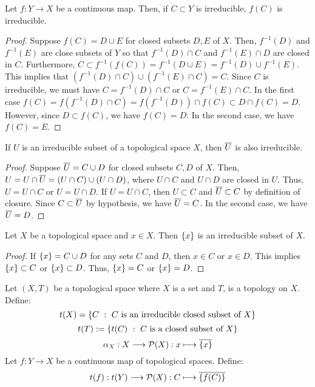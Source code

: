 \begin{lem}\label{lem:im-irred}
Let $f : Y \to X$ be a continuous map.
Then, if $C \subset Y$ is irreducible, $f(C)$
is irreducible.
\end{lem}
\begin{proof}
Suppose $f(C) = D \cup E$ for closed subsets $D, E$ of $X$.
Then, $f^{-1}(D)$ and $f^{-1}(E)$ are close subsets of $Y$
so that $f^{-1}(D) \cap C$ and $f^{-1}(E) \cap D$ are closed
in $C$. Furthermore,
$C \subset f^{-1}(f(C)) = f^{-1}(D \cup E)
= f^{-1}(D) \cup f^{-1}(E)$. This implies that
$(f^{-1}(D) \cap C) \cup (f^{-1}(E) \cap C) = C$.
Since $C$ is irreducible, we must have $C = f^{-1}(D) \cap C$
or $C = f^{-1}(E) \cap C$.
In the first case
$f(C) = f(f^{-1}(D) \cap C)
= f(f^{-1}(D)) \cap f(C) \subset D \cap f(C) = D$.
However, since $D \subset f(C)$, we have $f(C) = D$. In the second
case, we have $f(C) = E$.
\end{proof}

\begin{lem}\label{lem:cls-irred}
If $U$ is an irreducible subset of a topological space $X$,
then $\cls{U}$ is also irreducible.
\end{lem}
\begin{proof}
Suppose $\cls{U} = C \cup D$ for closed subsets $C, D$ of $X$.
Then, $U = U \cap \cls{U} = (U \cap C) \cup (U \cap D)$, where
$U \cap C$ and $U \cap D$ are closed in $U$. Thus, $U = U \cap C$
or $U = U \cap D$. If $U = U \cap C$, then $U \subset C$ and
$\cls{U} \subset C$ by definition of closure.
Since $C \subset \cls{U}$ by hypothesis, we have $\cls{U} = C$.
In the second case, we have $\cls{U} = D$.
\end{proof}

\begin{lem}\label{lem:single-irred}
Let $X$ be a topological space and $x \in X$. Then $\set{x}$
is an irreducible subset of $X$.
\end{lem}
\begin{proof}
If $\set{x} = C \cup D$ for any sets $C$ and $D$,
then $x \in C$ or $x \in D$. This implies
$\set{x} \subset C$ or $\set{x} \subset D$. Thus,
$\set{x} = C$ or $\set{x} = D$.
\end{proof}

\begin{cns}\label{cns:schematization}
Let $(X, T)$ be a topological space where $X$ is a set
and $T$, is a topology on $X$.
Define:
\[
t(X) = \set[C]{C \text{ is an irreducible closed subset of } X}
\]
\[
t(T) := \set[t(C)]{C \text{ is a closed subset of } X}
\]
\[
\alpha_X : X \to \cP(X) : x \mapsto \cls{\set{x}}
\]
Let $f : Y \to X$ be a continuous map of topological
spaces. Define:
\[
t(f) : t(Y) \to \mc{P}(X) : C \mapsto \cls{\set{f(C)}}
\]
\end{cns}

